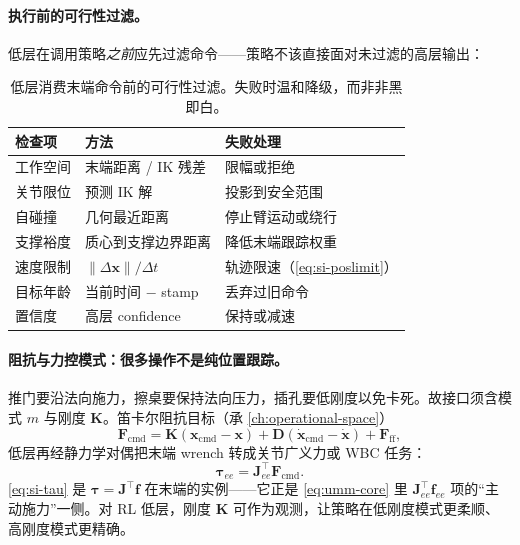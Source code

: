 \paragraph{执行前的可行性过滤。}
低层在调用策略\emph{之前}应先过滤命令——策略不该直接面对未过滤的高层输出：

\begin{table}[H]\centering\small
\caption{低层消费末端命令前的可行性过滤。失败时温和降级，而非非黑即白。}
\label{tab:si-feasibility}
\begin{tabular}{lll}
\toprule
检查项 & 方法 & 失败处理 \\
\midrule
工作空间 & 末端距离 / IK 残差 & 限幅或拒绝 \\
关节限位 & 预测 IK 解 & 投影到安全范围 \\
自碰撞 & 几何最近距离 & 停止臂运动或绕行 \\
支撑裕度 & 质心到支撑边界距离 & 降低末端跟踪权重 \\
速度限制 & $\|\Delta\mathbf x\|/\Delta t$ & 轨迹限速（\cref{eq:si-poslimit}） \\
目标年龄 & 当前时间 $-$ stamp & 丢弃过旧命令 \\
置信度 & 高层 confidence & 保持或减速 \\
\bottomrule
\end{tabular}
\end{table}

\paragraph{阻抗与力控模式：很多操作不是纯位置跟踪。}
推门要沿法向施力，擦桌要保持法向压力，插孔要低刚度以免卡死。故接口须含模式 $m$ 与刚度 $\mathbf K$。笛卡尔阻抗目标（承 \cref{ch:operational-space}）
\begin{equation}
  \mathbf F_{\mathrm{cmd}}=\mathbf K(\mathbf x_{\mathrm{cmd}}-\mathbf x)+\mathbf D(\dot{\mathbf x}_{\mathrm{cmd}}-\dot{\mathbf x})+\mathbf F_{\mathrm{ff}},
  \label{eq:si-impedance}
\end{equation}
低层再经静力学对偶把末端 wrench 转成关节广义力或 WBC 任务：
\begin{equation}
  \boldsymbol\tau_{ee}=\mathbf J_{ee}^\top\mathbf F_{\mathrm{cmd}}.
  \label{eq:si-tau}
\end{equation}
\cref{eq:si-tau} 是 $\boldsymbol\tau=\mathbf J^\top\mathbf f$ 在末端的实例——它正是 \cref{eq:umm-core} 里 $\mathbf J_{ee}^\top\mathbf f_{ee}$ 项的“主动施力”一侧。对 RL 低层，刚度 $\mathbf K$ 可作为观测，让策略在低刚度模式更柔顺、高刚度模式更精确。

